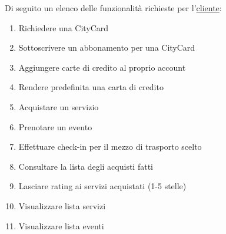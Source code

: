 \vspace{0.5cm}

Di seguito un elenco delle funzionalità richieste per l'\ul{cliente}:
\begin{enumerate}[label=c\arabic*)]
    \item Richiedere una CityCard
    \item Sottoscrivere un abbonamento per una CityCard
    \item Aggiungere carte di credito al proprio account
    \item Rendere predefinita una carta di credito
    \item Acquistare un servizio
    \item Prenotare un evento
    \item Effettuare check-in per il mezzo di trasporto scelto
    \item Consultare la lista degli acquisti fatti
    \item Lasciare rating ai servizi acquistati (1-5 stelle)
    \item Visualizzare lista servizi
    \item Visualizzare lista eventi 
\end{enumerate}